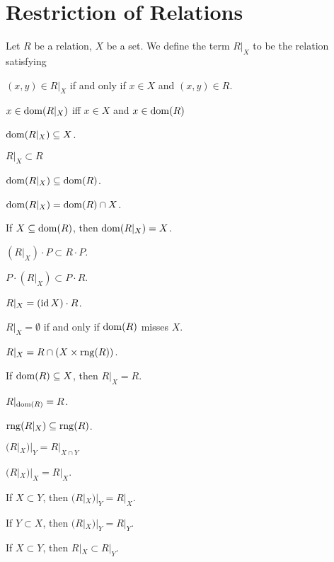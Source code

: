 \documentclass{article}
\begin{document}
\section{Restriction of Relations}

\begin{definition}
Let $R$ be a relation, $X$ be a set.
We define the term $R|_{X}$ to be the relation satisfying
\begin{defn}
\item $(x,y)\in R|_{X}$ if and only if $x\in X$ and $(x,y)\in R$.
\end{defn}
\end{definition}

\begin{thm}
\item\label{relat1:57} $x \in \operatorname{dom}(R|_{X})$ iff $x \in X$ and $x \in \operatorname{dom}(R)$
\item\label{relat1:58} $\operatorname{dom}(R|_{X})\subseteq X$.
\item\label{relat1:59} $R|_{X}\subset R$
\item\label{relat1:60} $\operatorname{dom}(R|_{X})\subseteq\operatorname{dom}(R)$.
\item\label{relat1:61} $\operatorname{dom}(R|_{X})=\operatorname{dom}(R)\cap X$.
\item\label{relat1:62} If $X\subseteq\operatorname{dom}(R)$, then $\operatorname{dom}(R|_{X})=X$.
\item\label{relat1:63} $(R|_{X})\cdot P\subset R\cdot P$.
\item\label{relat1:64} $P\cdot(R|_{X})\subset P\cdot R$.
\item\label{relat1:65} $R|_{X}=(\operatorname{id} X)\cdot R$.
\item\label{relat1:66} $R|_{X}=\emptyset$ if and only if $\operatorname{dom}(R)$ misses $X$.
\item\label{relat1:67} $R|_{X}=R\cap(X\times\operatorname{rng}(R))$.
\item\label{relat1:68} If $\operatorname{dom}(R)\subseteq X$, then $R|_{X}=R$.
\item\label{relat1:69} $R|_{\operatorname{dom}(R)}=R$.
\item\label{relat1:70} $\operatorname{rng}(R|_{X})\subseteq\operatorname{rng}(R)$.
\item\label{relat1:71} $(R|_{X})|_{Y} = R|_{X\cap Y}$
\item\label{relat1:72} $(R|_{X})|_{X}=R|_{X}$.
\item\label{relat1:73} If $X\subset Y$, then $(R|_{X})|_{Y}=R|_{X}$.
\item\label{relat1:74} If $Y\subset X$, then $(R|_{X})|_{Y}=R|_{Y}$.
\item\label{relat1:75} If $X\subset Y$, then $R|_{X}\subset R|_{Y}$.

\end{thm}
\end{document}
